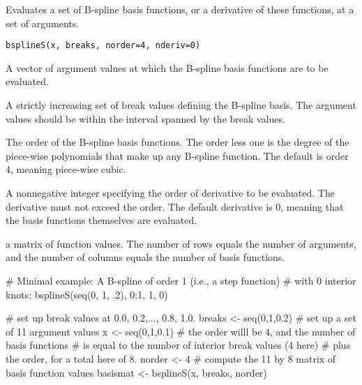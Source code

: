 \documentclass{article}
\begin{document}
\begin{Description}\relax
Evaluates a set of B-spline basis functions, or a derivative of these
functions, at a set of arguments.
\end{Description}
\begin{Usage}
\begin{verbatim}
bsplineS(x, breaks, norder=4, nderiv=0)
\end{verbatim}
\end{Usage}
\begin{Arguments}
\begin{ldescription}
\item[\code{x}] A vector of argument values at which the B-spline basis functions
are to be evaluated.

\item[\code{breaks}] A strictly increasing set of break values defining the B-spline
basis.  The argument values  should be within the interval
spanned by the break values.

\item[\code{norder}] The order of the B-spline basis functions.  The order less one is
the degree of the piece-wise polynomials that make up any B-spline
function. The default is order 4, meaning piece-wise cubic.

\item[\code{nderiv}] A nonnegative integer specifying the order of derivative to be
evaluated.  The derivative must not exceed the order.  The default 
derivative is 0, meaning that the basis functions themselves are
evaluated. 

\end{ldescription}
\end{Arguments}
\begin{Value}
a matrix of function values.  The number of rows equals the number of 
arguments, and the number of columns equals the number of basis
functions.
\end{Value}
\begin{Examples}
\begin{ExampleCode}
# Minimal example:  A B-spline of order 1 (i.e., a step function)
# with 0 interior knots:
bsplineS(seq(0, 1, .2), 0:1, 1, 0)

#  set up break values at 0.0, 0.2,..., 0.8, 1.0.
breaks <- seq(0,1,0.2)
#  set up a set of 11 argument values
x <- seq(0,1,0.1)
#  the order willl be 4, and the number of basis functions
#  is equal to the number of interior break values (4 here)
#  plus the order, for a total here of 8.
norder <- 4
#  compute the 11 by 8 matrix of basis function values
basismat <- bsplineS(x, breaks, norder)
\end{ExampleCode}
\end{Examples}
\end{document}
